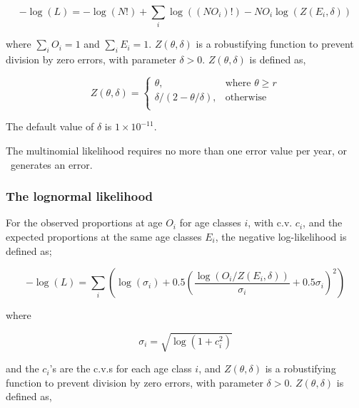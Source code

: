 \begin{equation}
  -\log \left(L \right) =  -\log \left(N! \right) + \sum\limits_i \log \left( \left(NO_i \right)! \right) - NO_i \log \left(Z \left(E_i,\delta \right) \right)
\end{equation}

where $\sum\limits_i O_i = 1$ and $\sum\limits_i E_i = 1$. $Z \left(\theta,\delta \right)$ is a robustifying function to prevent division by zero errors, with parameter $\delta>0$. $Z \left(\theta,\delta \right)$ is defined as,

\begin{equation}
   Z \left(\theta,\delta \right) = \begin{cases}
	  \theta, & \text{where $\theta \ge r$} \\
	  \delta/\left( 2-\theta/\delta \right), & \text{otherwise} \\  
  \end{cases}
\end{equation}

The default value of $\delta$ is $1 \times 10^{-11}$.

\TODO

The multinomial likelihood requires no more than one error value per year, or \SPM\ generates an error.

\TODOend

\subsubsection*{The lognormal likelihood}

For the observed proportions at age $O_i$ for age classes $i$, with c.v. $c_i$, and the expected proportions at the same age classes $E_i$, the negative log-likelihood is defined as; 

\begin{equation}
 - \log \left(L \right) = \sum\limits_i \left( \log \left( \sigma _i \right) + 0.5\left( \frac{\log \left(O_i / Z \left(E_i,\delta \right) \right)}{\sigma_i} + 0.5 \sigma_i \right)^2 \right)
\end{equation}

where 

\begin{equation}
  \sigma_i  = \sqrt{\log \left(1+c_i^2 \right)}
\end{equation}

and the $c_i$'s are the c.v.s for each age class $i$, and $Z \left(\theta,\delta \right)$ is a robustifying function to prevent division by zero errors, with parameter $\delta>0$. $Z \left(\theta,\delta \right)$ is defined as,

